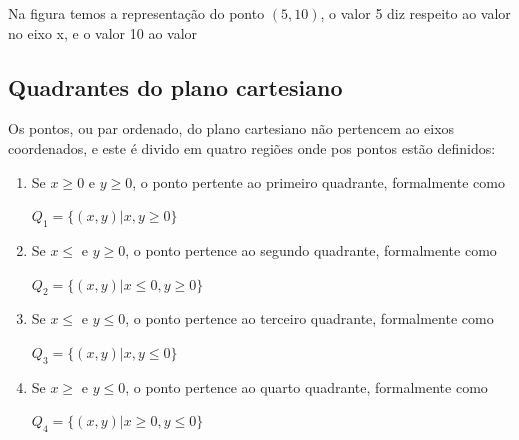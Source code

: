 \begin{multicols*}{2}
    Na figura temos a representação do ponto $(5,10)$, o valor 5 diz respeito ao valor no eixo x, e o valor 10 ao valor
    \subsection{Quadrantes do plano cartesiano}
    Os pontos, ou par ordenado, do plano cartesiano não pertencem ao eixos coordenados, e este é divido em quatro regiões onde pos pontos estão definidos:
    \begin{enumerate}[wide, labelwidth=!, labelindent=0pt]
        \item Se $x \ge 0$ e $y \ge 0$, o ponto pertente ao primeiro quadrante, formalmente como

              $Q_1 = \{ (x,y)| x,y \ge 0 \}$
        \item Se $x \le $ e $ y \ge 0 $, o ponto pertence ao segundo quadrante, formalmente como

              $Q_2 = \{  (x,y) | x \le 0, y \ge 0 \}$

        \item Se $x \le $ e $ y \le 0 $, o ponto pertence ao terceiro quadrante, formalmente como

              $Q_3 = \{  (x,y) | x , y \le 0 \}$

        \item Se $x \ge $ e $ y \le 0 $, o ponto pertence ao quarto quadrante, formalmente como

              $Q_4 = \{  (x,y) | x \ge 0 ,y \le 0 \}$
    \end{enumerate}


\end{multicols*}
